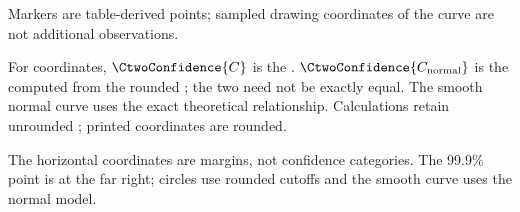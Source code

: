 \begin{landscape}
\begin{minipage}{\linewidth}
\begin{minipage}[t]{.43\linewidth}
Markers are table-derived points; sampled drawing coordinates of the curve are not additional observations.

For  coordinates, $\CtwoConfidence{C}$ is the . $\CtwoConfidence{C_{\rm normal}}$ is the  computed from the rounded ; the two need not be exactly equal. The smooth normal curve uses the exact theoretical relationship. Calculations retain unrounded ; printed coordinates are rounded.
\end{minipage}
\end{minipage}
\par\medskip

The horizontal coordinates are margins, not confidence categories. The 99.9\% point is at the far right; circles use rounded cutoffs and the smooth curve uses the normal model.

\end{landscape}
\clearpage
\clearpage
